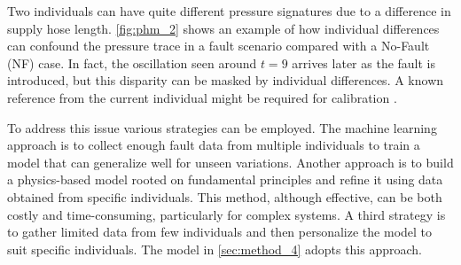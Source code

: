 Two individuals can have quite different pressure signatures due to a difference in supply hose length. \cref{fig:phm_2} shows an example of how individual differences can confound the pressure trace in a fault scenario compared with a No-Fault (NF) case. 
In fact, the oscillation seen around $t = 9$ arrives later as the fault is introduced, but this disparity can be masked by individual differences. A known reference from the current individual might be required for calibration \cite{jakobsson2022time}. %

To address this issue various strategies can be employed. The machine learning approach is to collect enough fault data from multiple individuals to train a model that can generalize well for unseen variations. Another approach is to build a physics-based model rooted on fundamental principles and refine it using data obtained from specific individuals. This method, although effective, can be both costly and time-consuming, particularly for complex systems. 
A third strategy is to gather limited data from few individuals and then personalize the model to suit specific individuals. 
The model in \cref{sec:method_4} adopts this approach. 




